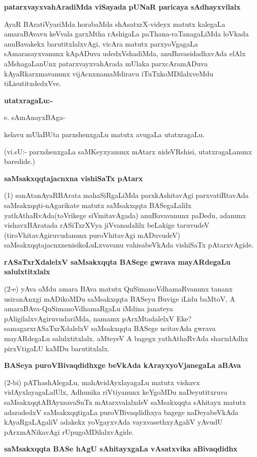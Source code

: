 \noindent
\textbf{patarxvayxvahAradiMda viSayada pUNaR paricaya sAdhayxvilalx}\label{page30}

AyaR BAratiVyariMda horabaMda shAsatxrX-videyx matutx kalegaLa amaraBAvavu keVvala garxMtha rAshigaLa paThana-raTanagaLiMda loVkada anuBavakekx barutitxlalxvAgi, vicAra matutx parxyoVgagaLa sAmarasayxvanunx kApADuva udedxVshadiMda, anuBavasidadhxvAda elAlx aMshagaLanUnx patarxvayxvahArada mUlaka parxcAramADuva kAyaRkarxmavanunx vijAcnxnamaMdiravu iTuTxkoMDilalxveMdu tiLisutitxdedxVve.

\noindent
\textbf{utatxragaLu:-}

e. sAmAnayxBAga-

kelavu mUlaBUta parxshenxgaLu matutx avugaLa utatxragaLu.

(vi.sU:- parxshenxgaLa saMKeyxyanunx mAtarx nideVRshisi, utatxragaLanunx baredide.)

\noindent
\textbf{saMsakxqqtajacnxna vishiSaTx pAtarx}\label{page30}

(1) sanAtanAyaRBArata mahaSiRgaLiMda parxkAshitavAgi parxvatiRtavAda saMsakxqqti-nAgarikate matutx saMsakxqqta BASegaLalilx yathAthaRvAda(toVrikege siVmitavAgada) anuBavavanunx paDedu, adanunx vishavxBAratada rASiTxrXVya jiVvanadalilx beLakige taruvudeV (tiroVhitavAgiruvudanunx puroVhitavAgi mADuvudeV) saMsakxqqtajacnxnenisikoLuLxvavanu vahisabeVkAda vishiSaTx pAtarxvAgide.

\noindent
\textbf{rASaTxrXdalelxV saMsakxqqta BASege gwrava mayARdegaLu salulxtitxlalx}\label{page30}

(2-e) yAva oMdu amara BAva matutx QuSimanoVdhamaRvanunx tananx usiranAnxgi mADikoMDu saMsakxqqta BASeyu Buvige iLidu baMtoV, A amaraBAva-QuSimanoVdhamaRgaLu iMdina janateya pAligilalxvAgiruvudariMda, namamx pArxMtadalelxV Eke? samagarxrASaTxrXdalelxV saMsakxqqta BASege ucitavAda gwrava mayARdegaLu salulxtitxlalx. aMteyeV A bagegx yathAthaRvAda sharxdAdhx pirxVtigaLU kaMDu barutitxlalx.

\noindent
\textbf{BASeya puroVBivaqdidhxge beVkAda kArayxyoVjanegaLa aBAva}\label{page31}

(2-bi) pAThashAlegaLu, mahAvidAyxlayagaLu matutx vishavx vidAyxlayagaLalUlx, Adhunika riVtiyanunx keYgoMDu naDeyutitxruva saMsakxqqtABAyxsavaSuTx mAtarxvalalxdeV saMsakxqqta sAhitayx matutx adaradedxV saMsakxqqtigaLa puroVBivaqdidhxya bagege naDeyabeVkAda kAyaRgaLAgaliV adakekx yoVgayxvAda vayxvasethxyAgaliV yAvudU pArxmANikavAgi rUpugoMDilalxvAgide.

\noindent
\textbf{saMsakxqqta BASe hAgU sAhitayxgaLa vAsatxvika aBivaqdidhx}\label{page31}

